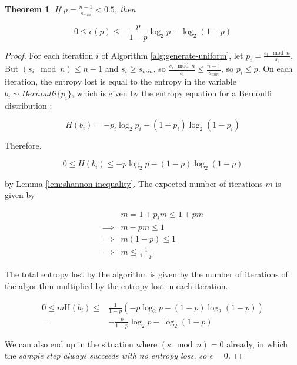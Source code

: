 \documentclass[12pt]{article}
\newtheorem{theorem}{Theorem}
\newcommand{\entropy}[1]{\mathrm{H}(#1)}
\begin{document}
\begin{theorem}
    \label{thm:loss}
If $p = \frac{n-1}{s_{min}} < 0.5$, then

\begin{equation}
0 \le \epsilon(p) \le -\frac{p}{1-p}\log_2p - \log_2(1-p)
\end{equation}

\end{theorem}

\begin{proof}
For each iteration $i$ of Algorithm \ref{alg:generate-uniform}, let $p_i = \frac{s_i \mod n}{s_i}$. But $(s_i \mod n) \le n-1$ and $s_i \ge s_{min}$, so $\frac{s_i \mod n}{s_i} \le \frac{n-1}{s_{min}}$, so $p_i \le p$. On each iteration, the entropy lost is equal to the entropy in the variable $b_i \sim Bernoulli\{p_i\}$, which is given by the entropy equation for a Bernoulli distribution \cite{cover1999elements}:

\begin{equation}
H(b_i) = -p_i\log_2p_i - (1-p_i)\log_2(1-p_i)
\end{equation}

Therefore, 

\begin{equation}
0 \le H(b_i) \le -p\log_2p - (1-p)\log_2(1-p) 
\end{equation}

by Lemma \ref{lem:shannon-inequality}. The expected number of iterations $m$ is given by

\begin{align}
& m = 1 + p_im \le 1 + pm \\
\implies & m-pm \le 1 \\
\implies & m(1-p) \le 1 \\
\implies & m \le \frac{1}{1-p}
\end{align}

The total entropy lost by the algorithm is given by the number of iterations of the algorithm multiplied by the entropy lost in each iteration.

\begin{align}
0 \le m\entropy{b_i} \le & \frac{1}{1-p}(-p\log_2p - (1-p)\log_2(1-p) ) \\
= & -\frac{p}{1-p}\log_2p - \log_2(1-p)
\end{align}

We can also end up in the situation where $(s \mod n) = 0$ already, in which the \em sample \em step always succeeds with no entropy loss, so $\epsilon=0$.
\end{proof}
\end{document}
